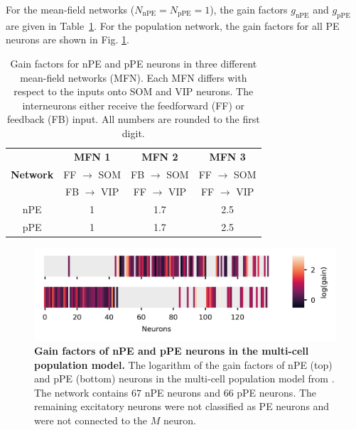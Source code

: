 \documentclass[10pt,a4paper]{article}
\begin{document}
For the mean-field networks ($ N_\mathrm{nPE} = N_\mathrm{pPE} = 1 $), the gain factors $g_\mathrm{nPE}$ and $g_\mathrm{pPE}$ are given in Table~\ref{tab:gain_factors_MFN}. For the population network, the gain factors for all PE neurons are shown in Fig. \ref{fig:Fig_gains}. 
%
\begin{table}[h!]
\centering
\begin{tabular}{ |c|c|c|c| }
\hline
 & \textbf{MFN 1} & \textbf{MFN 2} & \textbf{MFN 3}  \\
\textbf{Network} & FF $\rightarrow$ SOM  & FB $\rightarrow$ SOM  & FF $\rightarrow$ SOM  \\
 & FB $\rightarrow$ VIP  & FF $\rightarrow$ VIP  & FF $\rightarrow$ VIP  \\
\hline
\hline
nPE & 1 & 1.7 & 2.5\\
pPE & 1 & 1.7 & 2.5 \\
\hline
\end{tabular}
\caption{\footnotesize{Gain factors for nPE and pPE neurons in three different mean-field networks (MFN). Each MFN differs with respect to the inputs onto SOM and VIP neurons. The interneurons either receive the feedforward (FF) or feedback (FB) input. All numbers are rounded to the first digit.}}
\label{tab:gain_factors_MFN}
\end{table}
%
%
\begin{figure}[h!]
	\centering
    \includegraphics{../results/figures/final/Figure_gains}
\caption{\footnotesize{\bf Gain factors of nPE and pPE neurons in the multi-cell population model.\newline}
{The logarithm of the gain factors of nPE (top) and pPE (bottom) neurons in the multi-cell population model from \citep{hertag2022prediction}. The network contains $67$ nPE neurons and $66$ pPE neurons. The remaining excitatory neurons were not classified as PE neurons and were not connected to the $M$ neuron.}}
\label{fig:Fig_gains}
\end{figure}
%
%
\end{document}
